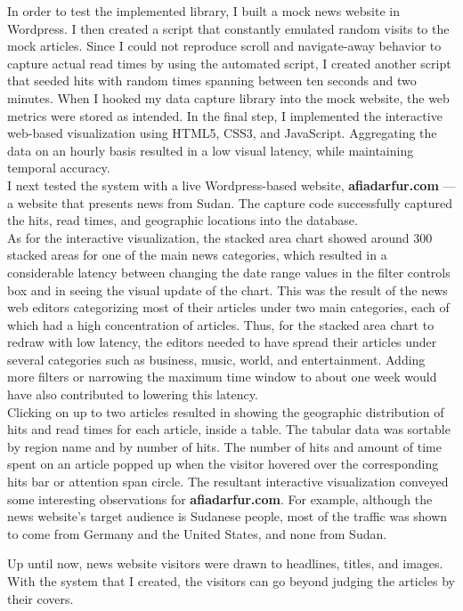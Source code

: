 \documentclass[12pt]{article}
\begin{document}
{In order to test the implemented library, I built a mock news website in Wordpress. I then created a script that constantly emulated random visits to the mock articles. Since I could not reproduce scroll and navigate-away behavior to capture actual read times by using the automated script, I created another script that seeded hits with random times spanning between ten seconds and two minutes. When I hooked my data capture library into the mock website, the web metrics were stored as intended. 
In the final step, I implemented the interactive web-based visualization using HTML5, CSS3, and JavaScript. Aggregating the data on an hourly basis resulted in a low visual latency, while maintaining temporal accuracy. \\

I next tested the system with a live Wordpress-based website, \textbf{afiadarfur.com} --- a website that presents news from Sudan. The capture code successfully captured the hits, read times, and geographic locations into the database.  \\ 
As for the interactive visualization, the stacked area chart showed around 300 stacked areas for one of the main news categories, which resulted in a considerable latency between changing the date range values in the filter controls box and in seeing the visual update of the chart. This was the result of the news web editors categorizing most of their articles under two main categories, each of which had a high concentration of articles. Thus, for the stacked area chart to redraw with low latency, the editors needed to have spread their articles under several categories such as business, music, world, and entertainment. Adding more filters or narrowing the maximum time window to about one week would have also contributed to lowering this latency. \\ Clicking on up to two articles resulted in showing the geographic distribution of hits and read times for each article, inside a table. The tabular data was sortable by region name and by number of hits. The number of hits and amount of time spent on an article popped up when the visitor hovered over the corresponding hits bar or attention span circle. The resultant interactive visualization conveyed some interesting observations for \textbf{afiadarfur.com}. For example, although the news website's target audience is Sudanese people, most of the traffic was shown to come from Germany and the United States, and none from Sudan.

Up until now, news website visitors were drawn to headlines, titles, and images. With the system that I created, the visitors can go beyond judging the articles by their covers.  



}
\end{document}
